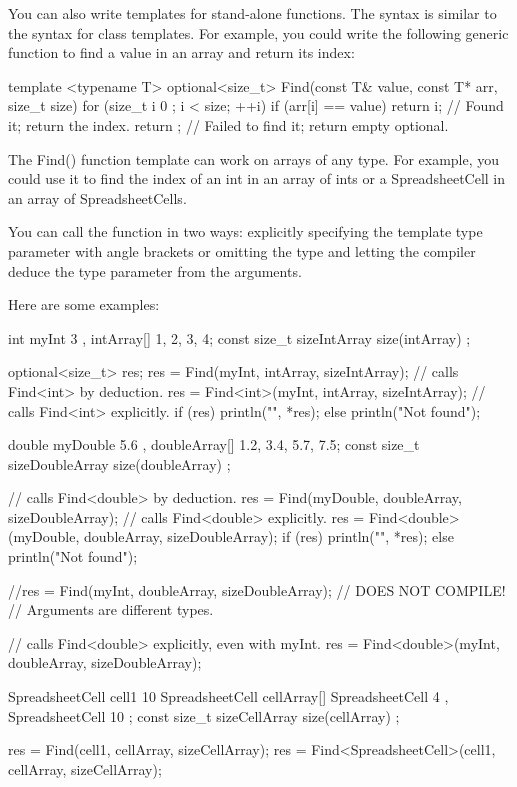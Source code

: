 
You can also write templates for stand-alone functions. The syntax is similar to the syntax for class templates. For example, you could write the following generic function to find a value in an array and return its index:

\begin{cpp}
template <typename T>
optional<size_t> Find(const T& value, const T* arr, size_t size)
{
    for (size_t i { 0 }; i < size; ++i) {
        if (arr[i] == value) {
            return i; // Found it; return the index.
        }
    }
    return {}; // Failed to find it; return empty optional.
}
\end{cpp}

The Find() function template can work on arrays of any type. For example, you could use it to find the index of an int in an array of ints or a SpreadsheetCell in an array of SpreadsheetCells.

You can call the function in two ways: explicitly specifying the template type parameter with angle brackets or omitting the type and letting the compiler deduce the type parameter from the arguments.

Here are some examples:

\begin{cpp}
int myInt { 3 }, intArray[] {1, 2, 3, 4};
const size_t sizeIntArray { size(intArray) };

optional<size_t> res;
res = Find(myInt, intArray, sizeIntArray); // calls Find<int> by deduction.
res = Find<int>(myInt, intArray, sizeIntArray); // calls Find<int> explicitly.
if (res) { println("{}", *res); }
else { println("Not found"); }

double myDouble { 5.6 }, doubleArray[] {1.2, 3.4, 5.7, 7.5};
const size_t sizeDoubleArray { size(doubleArray) };

// calls Find<double> by deduction.
res = Find(myDouble, doubleArray, sizeDoubleArray);
// calls Find<double> explicitly.
res = Find<double>(myDouble, doubleArray, sizeDoubleArray);
if (res) { println("{}", *res); }
else { println("Not found"); }

//res = Find(myInt, doubleArray, sizeDoubleArray); // DOES NOT COMPILE!
                                                // Arguments are different types.

// calls Find<double> explicitly, even with myInt.
res = Find<double>(myInt, doubleArray, sizeDoubleArray);

SpreadsheetCell cell1 { 10 }
SpreadsheetCell cellArray[] { SpreadsheetCell { 4 }, SpreadsheetCell { 10 } };
const size_t sizeCellArray { size(cellArray) };

res = Find(cell1, cellArray, sizeCellArray);
res = Find<SpreadsheetCell>(cell1, cellArray, sizeCellArray);
\end{cpp}

